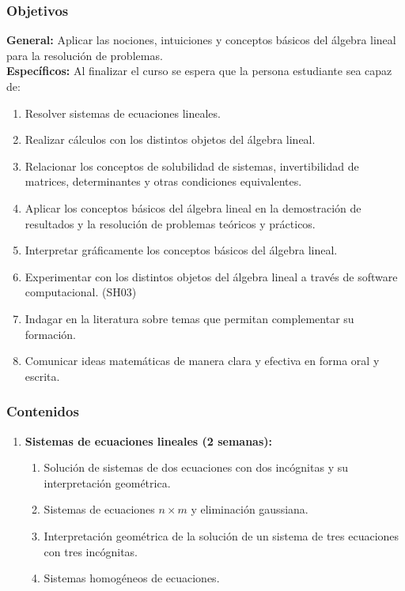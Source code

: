 \begin{refsection}
\subsubsection*{Objetivos}

\textbf{General:} Aplicar las nociones, intuiciones y conceptos básicos del álgebra lineal para la resolución de problemas. \\

\textbf{Específicos:} Al finalizar el curso se espera que la persona estudiante sea capaz de:

\begin{enumerate}
\item Resolver sistemas de ecuaciones lineales.
\item Realizar cálculos con los distintos objetos del álgebra lineal.
\item Relacionar los conceptos de solubilidad de sistemas, invertibilidad de matrices, determinantes y otras condiciones equivalentes.
\item Aplicar los conceptos básicos del álgebra lineal en la demostración de resultados y la resolución de problemas teóricos y prácticos.
\item Interpretar gráficamente los conceptos básicos del álgebra lineal.
\item Experimentar con los distintos objetos del álgebra lineal a través de software computacional. (SH03)
\item Indagar en la literatura sobre temas que permitan complementar su formación.
\item Comunicar ideas matemáticas de manera clara y efectiva en forma oral y escrita.
\end{enumerate}

\subsubsection*{Contenidos}

\begin{enumerate}
\item \textbf{Sistemas de ecuaciones lineales (2 semanas):} 
\begin{enumerate}
    \item Solución de sistemas de dos ecuaciones con dos incógnitas y su interpretación geométrica.
    \item Sistemas de ecuaciones $n \times m$ y eliminación gaussiana.
    \item Interpretación geométrica de la solución de un sistema de tres ecuaciones con tres incógnitas.
    \item Sistemas homogéneos de ecuaciones.
\end{enumerate}


\end{enumerate}
\end{refsection}

